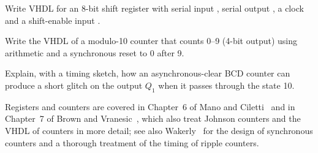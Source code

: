 \begin{exlist}
  \item Write VHDL for an 8-bit shift register with serial input , serial output , a clock and a shift-enable input .
  \item Write the VHDL of a modulo-10 counter that counts 0--9 (4-bit output) using  arithmetic and a synchronous reset to 0 after 9.
  \item Explain, with a timing sketch, how an asynchronous-clear BCD counter can produce a short glitch on the output $Q_1$ when it passes through the state 10.
\end{exlist}

Registers and counters are covered in Chapter~6 of Mano and Ciletti~\cite{mano2018} and in Chapter~7 of Brown and Vranesic~\cite{brown2009}, which also treat Johnson counters and the VHDL of counters in more detail; see also Wakerly~\cite{wakerly2006} for the design of synchronous counters and a thorough treatment of the timing of ripple counters.
